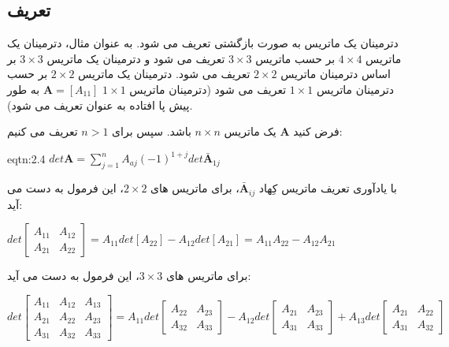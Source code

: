 \subsection{\textbf{تعریف}}
{
    \Large
    \begin{spacing}{1.5}
        دترمینان یک ماتریس به صورت بازگشتی تعریف می شود.
        به عنوان مثال، دترمینان یک ماتریس $4\times 4$ بر حسب ماتریس $3\times 3$ تعریف می شود و دترمینان یک ماتریس $3\times 3$ بر اساس دترمینان ماتریس $2\times 2$ تعریف می شود.
        دترمینان یک ماتریس $2\times 2$ بر حسب دترمینان ماتریس $1\times 1$ تعریف می شود
        (دترمینان ماتریس $1\times 1$ $\textbf{A}=[A_{11}]$ به طور پیش پا افتاده به عنوان  تعریف می شود).

        فرض کنید $\textbf{A}$ یک ماتریس $n\times n$ باشد. سپس برای $n>1$ تعریف می کنیم:

        \begin{eqtn}{eqtn:2.4}
            \centering
            $det\textbf{A}=\sum\limits_{j=1}^{n}A_{aj}(-1)^{1+j}det\bar{\textbf{A}}_{1j}$
        \end{eqtn}

        با یادآوری تعریف ماتریس کِهاد $\bar{\textbf{A}}_{ij}$، برای ماتریس های $2\times 2$، این فرمول به دست می آید:

        \begin{center}
            $det\begin{bmatrix}
                    A_{11} & A_{12} \\
                    A_{21} & A_{22}
            \end{bmatrix}=A_{11}det[A_{22}]-A_{12}det[A_{21}]=A_{11}A_{22}-A_{12}A_{21}$
        \end{center}

        برای ماتریس های $3\times 3$، این فرمول به دست می آید:

        \begin{center}
            $det\begin{bmatrix}
                    A_{11} & A_{12} & A_{13} \\
                    A_{21} & A_{22} & A_{23} \\
                    A_{31} & A_{32} & A_{33}
            \end{bmatrix}=A_{11}det\begin{bmatrix}
                                       A_{22} & A_{23} \\
                                       A_{32} & A_{33}
            \end{bmatrix}-A_{12}det\begin{bmatrix}
                                       A_{21} & A_{23} \\
                                       A_{31} & A_{33}
            \end{bmatrix}+A_{13}det\begin{bmatrix}
                                       A_{21} & A_{22} \\
                                       A_{31} & A_{32}
            \end{bmatrix}$
        \end{center}


\end{spacing}}

